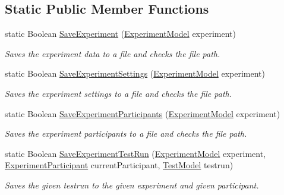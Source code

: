 \subsection*{Static Public Member Functions}
\begin{DoxyCompactItemize}
\item 
static Boolean \hyperlink{class_web_analyzer_1_1_controller_1_1_export_controller_a4b85a3cd4921ac619d484d0c3d2b031b}{Save\+Experiment} (\hyperlink{class_web_analyzer_1_1_models_1_1_base_1_1_experiment_model}{Experiment\+Model} experiment)
\begin{DoxyCompactList}\small\item\em Saves the experiment data to a file and checks the file path. \end{DoxyCompactList}\item 
static Boolean \hyperlink{class_web_analyzer_1_1_controller_1_1_export_controller_a293a07018f0a6c4380482d58c5080852}{Save\+Experiment\+Settings} (\hyperlink{class_web_analyzer_1_1_models_1_1_base_1_1_experiment_model}{Experiment\+Model} experiment)
\begin{DoxyCompactList}\small\item\em Saves the experiment settings to a file and checks the file path. \end{DoxyCompactList}\item 
static Boolean \hyperlink{class_web_analyzer_1_1_controller_1_1_export_controller_a8f08f0812bc86eaca9e42e076874ea94}{Save\+Experiment\+Participants} (\hyperlink{class_web_analyzer_1_1_models_1_1_base_1_1_experiment_model}{Experiment\+Model} experiment)
\begin{DoxyCompactList}\small\item\em Saves the experiment participants to a file and checks the file path. \end{DoxyCompactList}\item 
static Boolean \hyperlink{class_web_analyzer_1_1_controller_1_1_export_controller_a6053d7ce4cb34a29e17a212d5613cc79}{Save\+Experiment\+Test\+Run} (\hyperlink{class_web_analyzer_1_1_models_1_1_base_1_1_experiment_model}{Experiment\+Model} experiment, \hyperlink{class_web_analyzer_1_1_models_1_1_base_1_1_experiment_participant}{Experiment\+Participant} current\+Participant, \hyperlink{class_web_analyzer_1_1_models_1_1_data_model_1_1_test_model}{Test\+Model} testrun)
\begin{DoxyCompactList}\small\item\em Saves the given testrun to the given experiment and given participant. \end{DoxyCompactList}\item 

\end{DoxyCompactItemize}
